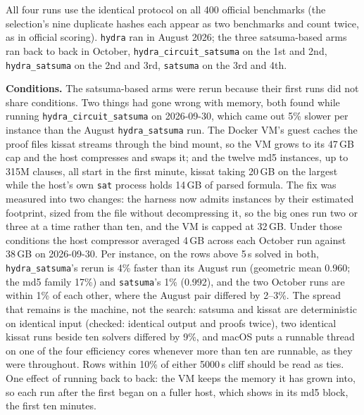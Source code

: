 \documentclass[10pt]{article}
\begin{document}
All four runs use the identical protocol on all 400 official
benchmarks (the selection's nine duplicate hashes each appear as two
benchmarks and count twice, as in official scoring). \texttt{hydra}
ran in August 2026; the three satsuma-based arms ran back to back in
October, \texttt{hydra\_circuit\_satsuma} on the 1st and 2nd,
\texttt{hydra\_satsuma} on the 2nd and 3rd, \texttt{satsuma} on the
3rd and 4th.

\textbf{Conditions.} The satsuma-based arms were rerun because their
first runs did not share conditions. Two things had gone wrong with
memory, both found while running \texttt{hydra\_circuit\_satsuma} on
2026-09-30, which came out 5\% slower per instance than the August
\texttt{hydra\_satsuma} run. The Docker VM's guest caches the proof
files kissat streams through the bind mount, so the VM grows to its
47\,GB cap and the host compresses and swaps it; and the twelve md5
instances, up to 315M clauses, all start in the first minute, kissat
taking 20\,GB on the largest while the host's own \texttt{sat}
process holds 14\,GB of parsed formula. The fix was measured into two
changes: the harness now admits instances by their estimated footprint,
sized from the file without decompressing it, so the big ones run two
or three at a time rather than ten, and the VM is capped at 32\,GB.
Under those conditions the host compressor averaged 4\,GB across each
October run against 38\,GB on 2026-09-30. Per instance, on the rows
above 5\,s solved in both, \texttt{hydra\_satsuma}'s rerun is 4\%
faster than its August run (geometric mean 0.960; the md5 family 17\%)
and \texttt{satsuma}'s 1\% (0.992), and the two October runs are within
1\% of each other, where the August pair differed by 2--3\%. The spread
that remains is the machine, not the search: satsuma and kissat are
deterministic on identical input (checked: identical output and proofs
twice), two identical kissat runs beside ten solvers differed by 9\%,
and macOS puts a runnable thread on one of the four efficiency cores
whenever more than ten are runnable, as they were throughout. Rows
within 10\% of either 5000\,s cliff should be read as ties. One effect
of running back to back: the VM keeps the memory it has grown into, so
each run after the first began on a fuller host, which shows in its md5
block, the first ten minutes.
\end{document}
